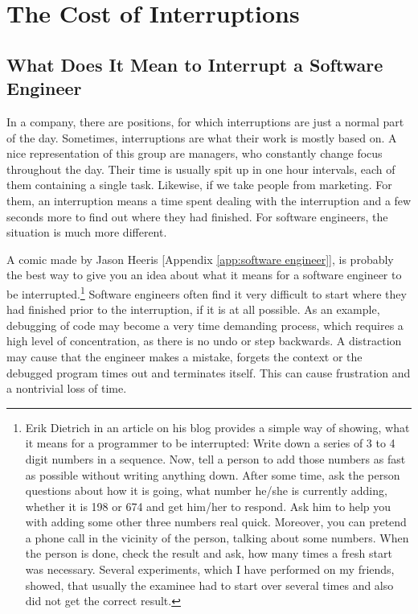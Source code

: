 \documentclass[11pt,singleside]{myfithesis2}
\begin{document}
	\section{The Cost of Interruptions}

		\subsection{What Does It Mean to Interrupt a Software Engineer}
In a company, there are positions, for which interruptions are just a normal part of the day. Sometimes, interruptions are what their work is mostly based on. A nice representation of this group are managers, who constantly change focus throughout the day. Their time is usually spit up in one hour intervals, each of them containing a single task. Likewise, if we take people from marketing. For them, an interruption means a time spent dealing with the interruption and a few seconds more to find out where they had finished. For software engineers, the situation is much more different.

A comic made by Jason Heeris [Appendix \ref{app:software engineer}],  is probably the best way to give you an idea about what it means for a software engineer to be interrupted.\footnote{Erik Dietrich in an article on his blog \cite{costOfInterruptions} provides a simple way of showing, what it means for a programmer to be interrupted: Write down a series of 3 to 4 digit numbers in a sequence. Now, tell a person to add those numbers as fast as possible without writing anything down. After some time, ask the person questions about how it is going, what number he/she is currently adding, whether it is 198 or 674 and get him/her to respond. Ask him to help you with adding some other three numbers real quick. Moreover, you can pretend a phone call in the vicinity of the person, talking about some numbers. When the person is done, check the result and ask, how many times a fresh start was necessary. Several experiments, which I have performed on my friends, showed, that usually the examinee had to start over several times and also did not get the correct result.} Software engineers often find it very difficult to start where they had finished prior to the interruption, if it is at all possible. As an example, debugging of code may become a very time demanding process, which requires a high level of concentration, as there is no undo or step backwards. A distraction may cause that the engineer makes a mistake, forgets the context or the debugged program times out and terminates itself. This can cause frustration and a nontrivial loss of time.
\end{document}
